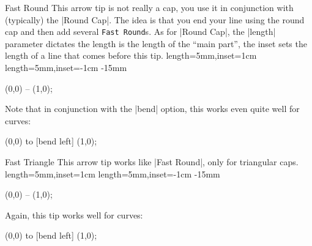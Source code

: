 \begin{arrowcap}{Fast Round}{
    This arrow tip is not really a cap, you use it in conjunction with
    (typically) the |Round Cap|. The idea is that you end your line using the
    round cap and then add several \texttt{Fast Round}s. As for |Round Cap|,
    the |length| parameter dictates the length is the length of the ``main
    part'', the inset sets the length of a line that comes before this tip.
}%
{length=5mm,inset=1cm}%
{length=5mm,inset=-1cm}%
{-15mm}

\begin{codeexample}[preamble={\usetikzlibrary{arrows.meta}}]
\tikz \draw [line width=1ex,
             -{Round Cap []. Fast Round[] Fast Round[]}]
  (0,0) -- (1,0);
\end{codeexample}
    Note that in conjunction with the |bend| option, this works even quite well
    for curves:
\begin{codeexample}[preamble={\usetikzlibrary{arrows.meta,bending}}]
\tikz [f/.tip = Fast Round] %
  \draw [line width=1ex, -{[bend] Round Cap[] . f f f}]
  (0,0) to [bend left] (1,0);
\end{codeexample}

    \begin{arrowcapexamples}
        \arrowcapexample[]
        \arrowcapexample[reversed]
        \arrowcapexample[cap angle=60]
        \arrowcapexample[cap angle=60,inset=5pt]
        \arrowcapexample[length=.5ex]
        \arrowcapexample[slant=.3]
    \end{arrowcapexamples}
\end{arrowcap}

\begin{arrowcap}{Fast Triangle}{
    This arrow tip works like |Fast Round|, only for triangular caps.
}%
{length=5mm,inset=1cm}%
{length=5mm,inset=-1cm}%
{-15mm}

\begin{codeexample}[preamble={\usetikzlibrary{arrows.meta}}]
\tikz \draw [line width=1ex,
             -{Triangle Cap []. Fast Triangle[] Fast Triangle[]}]
  (0,0) -- (1,0);
\end{codeexample}
    Again, this tip works well for curves:
\begin{codeexample}[preamble={\usetikzlibrary{arrows.meta,bending}}]
\tikz [f/.tip = Fast Triangle] %
  \draw [line width=1ex, -{[bend] Triangle Cap[] . f f f}]
  (0,0) to [bend left] (1,0);
\end{codeexample}

    \begin{arrowcapexamples}
        \arrowcapexample[]
        \arrowcapexample[reversed]
        \arrowcapexample[cap angle=60]
        \arrowcapexample[cap angle=60,inset=5pt]
        \arrowcapexample[length=.5ex]
        \arrowcapexample[slant=.3]
    \end{arrowcapexamples}
\end{arrowcap}


